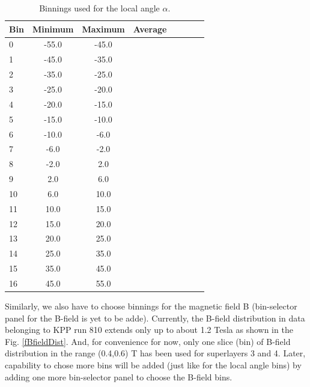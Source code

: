 \documentclass[12pt,epsfig]{article}
\begin{document}
\begin{table}%
\centering
\begin{tabular}{l*{6}{c}r}

Bin         & Minimum    & Maximum   & Average\\
\hline
0                 & -55.0    &  -45.0     \\
1                 & -45.0    &  -35.0     \\
2                 & -35.0    &  -25.0     \\
3                 & -25.0    &  -20.0     \\
4                 & -20.0    &  -15.0     \\
5                 & -15.0    &  -10.0     \\
6                 & -10.0    &  -6.0       \\
7                 & -6.0      &  -2.0       \\
8                 & -2.0      &   2.0       \\
9                 &  2.0      &   6.0       \\
10               &  6.0      &   10.0     \\
11               &  10.0    &  15.0       \\
12               &  15.0    &  20.0       \\
13               &  20.0    &  25.0       \\
14               &  25.0    &  35.0       \\
15               &  35.0    &  45.0       \\
16               &  45.0    &   55.0       \\

\hline
\end{tabular}
\caption{Binnings used for the local angle $\alpha$.}   \label{tabParLimits}
\label{tAngleBins}
\end{table}

Similarly, we also have to choose binnings for the magnetic field B (bin-selector panel for the B-field is yet to be adde). Currently, the B-field distribution in data belonging to KPP run 810 extends only up to about 1.2 Tesla as shown in the Fig. \ref{fBfieldDist}. And, for convenience for now, only one slice (bin) of B-field distribution in the range (0.4,0.6) T has been used for superlayers 3 and 4. Later, capability to chose more bins will be added (just like for the local angle bins) by adding one more bin-selector panel to choose the B-field bins.
\end{document}
